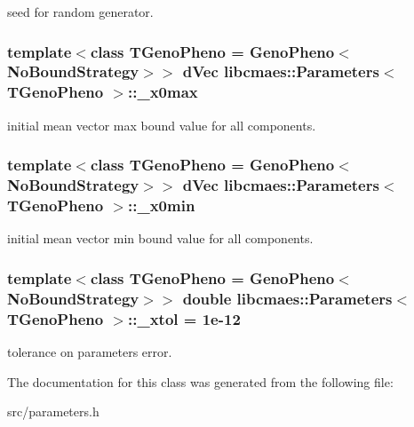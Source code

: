 seed for random generator. \hypertarget{classlibcmaes_1_1Parameters_aece9694af9bee78bb13b0994db7ac45e}{
\subsubsection[{\-\_\-x0max}]{\setlength{\rightskip}{0pt plus 5cm}template$<$class T\-Geno\-Pheno = Geno\-Pheno$<$\-No\-Bound\-Strategy$>$$>$ d\-Vec {\bf libcmaes\-::\-Parameters}$<$ T\-Geno\-Pheno $>$\-::\-\_\-x0max}}\label{classlibcmaes_1_1Parameters_aece9694af9bee78bb13b0994db7ac45e}
initial mean vector max bound value for all components. \hypertarget{classlibcmaes_1_1Parameters_aa3bb27467698d9cb7fc7e0a83b48800f}{
\subsubsection[{\-\_\-x0min}]{\setlength{\rightskip}{0pt plus 5cm}template$<$class T\-Geno\-Pheno = Geno\-Pheno$<$\-No\-Bound\-Strategy$>$$>$ d\-Vec {\bf libcmaes\-::\-Parameters}$<$ T\-Geno\-Pheno $>$\-::\-\_\-x0min}}\label{classlibcmaes_1_1Parameters_aa3bb27467698d9cb7fc7e0a83b48800f}
initial mean vector min bound value for all components. \hypertarget{classlibcmaes_1_1Parameters_aaa9e8eedba7d7140d116163b40f653f8}{
\subsubsection[{\-\_\-xtol}]{\setlength{\rightskip}{0pt plus 5cm}template$<$class T\-Geno\-Pheno = Geno\-Pheno$<$\-No\-Bound\-Strategy$>$$>$ double {\bf libcmaes\-::\-Parameters}$<$ T\-Geno\-Pheno $>$\-::\-\_\-xtol = 1e-\/12}}\label{classlibcmaes_1_1Parameters_aaa9e8eedba7d7140d116163b40f653f8}
tolerance on parameters error. 

The documentation for this class was generated from the following file\-:\begin{DoxyCompactItemize}
\item 
src/parameters.\-h\end{DoxyCompactItemize}
